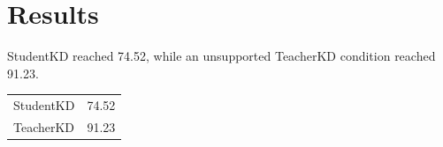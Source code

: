 \section{Results}
StudentKD reached 74.52, while an unsupported TeacherKD condition reached 91.23.
\begin{table}[h]
\begin{tabular}{lc}
StudentKD & 74.52 \\
TeacherKD & 91.23 \\
\end{tabular}
\end{table}
